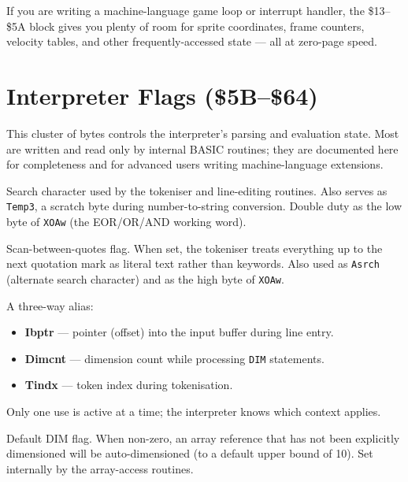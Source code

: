 \begin{tipbox}
If you are writing a machine-language game loop or interrupt handler, the
\$13--\$5A block gives you plenty of room for sprite coordinates, frame
counters, velocity tables, and other frequently-accessed state --- all at
zero-page speed.
\end{tipbox}

\section{Interpreter Flags (\$5B--\$64)}

This cluster of bytes controls the interpreter's parsing and evaluation state.
Most are written and read only by internal BASIC routines; they are documented
here for completeness and for advanced users writing machine-language
extensions.


Search character used by the tokeniser and line-editing routines.  Also serves
as \texttt{Temp3}, a scratch byte during number-to-string conversion.  Double
duty as the low byte of \texttt{XOAw} (the EOR/OR/AND working word).


Scan-between-quotes flag.  When set, the tokeniser treats everything up to the
next quotation mark as literal text rather than keywords.  Also used as
\texttt{Asrch} (alternate search character) and as the high byte of
\texttt{XOAw}.


A three-way alias:
\begin{itemize}
  \item \textbf{Ibptr} --- pointer (offset) into the input buffer during line entry.
  \item \textbf{Dimcnt} --- dimension count while processing \texttt{DIM} statements.
  \item \textbf{Tindx} --- token index during tokenisation.
\end{itemize}
Only one use is active at a time; the interpreter knows which context applies.


Default DIM flag.  When non-zero, an array reference that has not been
explicitly dimensioned will be auto-dimensioned (to a default upper bound of
10).  Set internally by the array-access routines.

